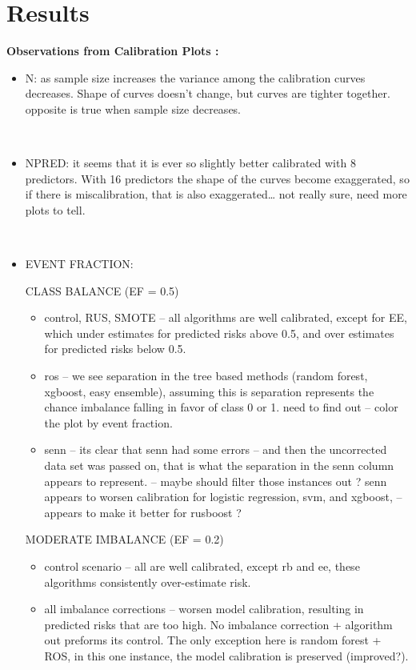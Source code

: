 \documentclass[AMA,STIX1COL,]{WileyNJD-v2}
\begin{document}
\newpage

\hypertarget{results}{%
\section{Results}\label{results}}

\textbf{Observations from Calibration Plots :}

\begin{itemize}
\item
  N: as sample size increases the variance among the calibration curves
  decreases. Shape of curves doesn't change, but curves are tighter
  together. opposite is true when sample size decreases.\\
  \strut \\
\item
  NPRED: it seems that it is ever so slightly better calibrated with 8
  predictors. With 16 predictors the shape of the curves become
  exaggerated, so if there is miscalibration, that is also
  exaggerated\ldots{} not really sure, need more plots to tell.\\
  \strut \\
\item
  EVENT FRACTION:

  CLASS BALANCE (EF = 0.5)

  \begin{itemize}
  \item
    control, RUS, SMOTE -- all algorithms are well calibrated, except
    for EE, which under estimates for predicted risks above 0.5, and
    over estimates for predicted risks below 0.5.
  \item
    ros -- we see separation in the tree based methods (random forest,
    xgboost, easy ensemble), assuming this is separation represents the
    chance imbalance falling in favor of class 0 or 1. need to find out
    -- color the plot by event fraction.
  \item
    senn -- its clear that senn had some errors -- and then the
    uncorrected data set was passed on, that is what the separation in
    the senn column appears to represent. -- maybe should filter those
    instances out ? senn appears to worsen calibration for logistic
    regression, svm, and xgboost, -- appears to make it better for
    rusboost ?
  \end{itemize}

  MODERATE IMBALANCE (EF = 0.2)

  \begin{itemize}
  \item
    control scenario -- all are well calibrated, except rb and ee, these
    algorithms consistently over-estimate risk.
  \item
    all imbalance corrections -- worsen model calibration, resulting in
    predicted risks that are too high. No imbalance correction +
    algorithm out preforms its control. The only exception here is
    random forest + ROS, in this one instance, the model calibration is
    preserved (improved?).
  \end{itemize}


\end{itemize}
\end{document}
